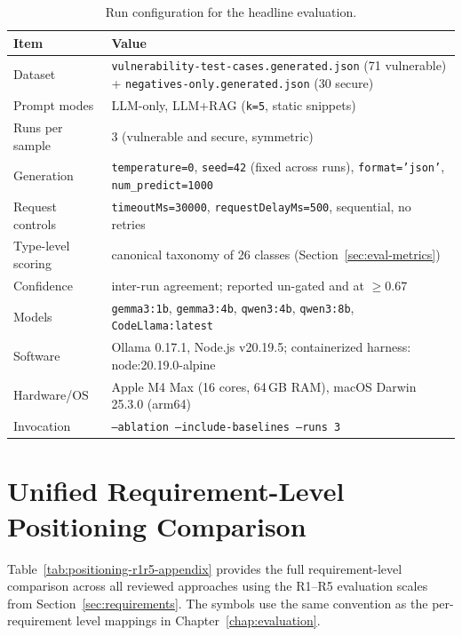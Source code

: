 \begin{table}[H]
  \centering
  \caption{Run configuration for the headline evaluation.}
  \label{tab:eval-reproducibility}
  \small
  \begin{tabular}{p{}p{}}
    \toprule
    Item & Value \\
    \midrule
    Dataset & \texttt{vulnerability-test-cases.generated.json} (71 vulnerable) + \texttt{negatives-only.generated.json} (30 secure) \\
    Prompt modes & LLM-only, LLM+RAG (\texttt{k=5}, static snippets) \\
    Runs per sample & 3 (vulnerable and secure, symmetric) \\
    Generation & \texttt{temperature=0}, \texttt{seed=42} (fixed across runs), \texttt{format='json'}, \texttt{num\_predict=1000} \\
    Request controls & \texttt{timeoutMs=30000}, \texttt{requestDelayMs=500}, sequential, no retries \\
    Type-level scoring & canonical taxonomy of 26 classes (Section~\ref{sec:eval-metrics}) \\
    Confidence & inter-run agreement; reported un-gated and at $\geq 0.67$ \\
    Models & \texttt{gemma3:1b}, \texttt{gemma3:4b}, \texttt{qwen3:4b}, \texttt{qwen3:8b}, \texttt{CodeLlama:latest} \\
    Software & Ollama 0.17.1, Node.js v20.19.5; containerized harness: node:20.19.0-alpine \\
    Hardware/OS & Apple M4 Max (16 cores, 64\,GB RAM), macOS Darwin 25.3.0 (arm64) \\
    Invocation & \texttt{--ablation --include-baselines --runs 3} \\
    \bottomrule
  \end{tabular}
\end{table}

\section{Unified Requirement-Level Positioning Comparison}
\label{appendix:positioning-table}

Table~\ref{tab:positioning-r1r5-appendix} provides the full requirement-level comparison across all reviewed approaches using the R1--R5 evaluation scales from Section~\ref{sec:requirements}. The symbols use the same convention as the per-requirement level mappings in Chapter~\ref{chap:evaluation}.

